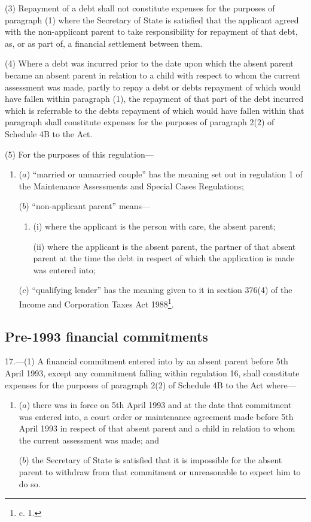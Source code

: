 \documentclass[a4paper]{article}
\begin{document}
(3) Repayment of a debt shall not constitute expenses for the purposes of paragraph (1) where the Secretary of State is satisfied that the applicant agreed with the non-applicant parent to take responsibility for repayment of that debt, as, or as part of, a financial settlement between them.

(4) Where a debt was incurred prior to the date upon which the absent parent became an absent parent in relation to a child with respect to whom the current assessment was made, partly to repay a debt or debts repayment of which would have fallen within paragraph (1), the repayment of that part of the debt incurred which is referrable to the debts repayment of which would have fallen within that paragraph shall constitute expenses for the purposes of paragraph 2(2) of Schedule 4B to the Act.

(5) For the purposes of this regulation—
\begin{enumerate}\item[]
($a$) “married or unmarried couple” has the meaning set out in regulation 1 of the Maintenance Assessments and Special Cases Regulations;

($b$) “non-applicant parent” means—
\begin{enumerate}\item[]
(i) where the applicant is the person with care, the absent parent;

(ii) where the applicant is the absent parent, the partner of that absent parent at the time the debt in respect of which the application is made was entered into;
\end{enumerate}

($c$) “qualifying lender” has the meaning given to it in section 376(4) of the Income and Corporation Taxes Act 1988\footnote{ c. 1.}.
\end{enumerate}

\subsection[17. Pre-1993 financial commitments]{Pre-1993 financial commitments}

17.—(1) A financial commitment entered into by an absent parent before 5th April 1993, except any commitment falling within regulation 16, shall constitute expenses for the purposes of paragraph 2(2) of Schedule 4B to the Act where—
\begin{enumerate}\item[]
($a$) there was in force on 5th April 1993 and at the date that commitment was entered into, a court order or maintenance agreement made before 5th April 1993 in respect of that absent parent and a child in relation to whom the current assessment was made; and

($b$) the Secretary of State is satisfied that it is impossible for the absent parent to withdraw from that commitment or unreasonable to expect him to do so.
\end{enumerate}
\end{document}

